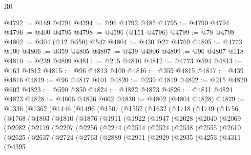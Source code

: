 \begin{lexlean}{R0}
\begin{coremodule}
@4792 := @169 @4791
@4794 := @96 @4792 @485
@4795 := @4790 @4794
@4796 := @400 @4795
@4798 := @4596 (@151 @4796)
@4799 := @78 @4798
@4802 := @304 (@12 @550) @547
@4804 := @430 @27 @4769
@4805 := @4773 @100
@4806 := @359 @4805
@4807 := @439 @4806
@4809 := @96 @4807 @118
@4810 := @239 @4809
@4811 := @215 @4810
@4812 := @4773 @594
@4813 := @163 @4812
@4815 := @96 @4813 @100
@4816 := @359 @4815
@4817 := @439 @4816
@4819 := @96 @4817 @101
@4820 := @239 @4819
@4822 := @215 @4820 @602
@4823 := @590 @850
@4824 := @4822 @4823
@4826 := @4811 @4824 @4823
@4828 := @4606 @4826 @602
@4830 := @4802 (@4804 @4828)
@4879 := @1336
    (@1362
      (@1446
        (@1496
          (@1507
            (@1552
              (@1632
                (@1718
                  (@1749
                    (@1756
                      (@1768
                        (@1803
                          (@1810
                            (@1876
                              (@1911
                                (@1922
                                  (@1947
                                    (@2028
                                      (@2040
                                        (@2069
                                          (@2082
                                            (@2179
                                              (@2207
                                                (@2256
                                                  (@2274
                                                    (@2514
                                                      (@2524
                                                        (@2538
                                                          (@2555
                                                            (@2610
                                                              (@2625
                                                                (@2637
                                                                  (@2724
                                                                    (@2763
                                                                      (@2889
                                                                        (@2911
                                                                          (@2929
                                                                            (@2935
                                                                              (@4253
                                                                                (@4311
                                                                                  (@4395

\end{coremodule}
\end{lexlean}
